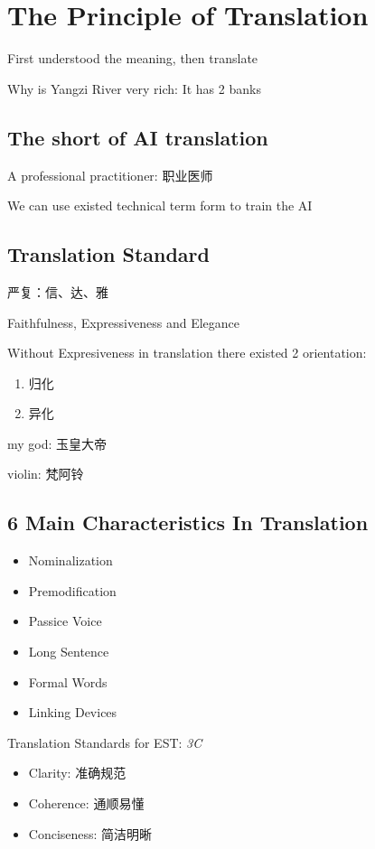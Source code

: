 \section{The Principle of Translation}%
\label{sec:The Principle of Translation}
First understood the meaning, then translate
\begin{eg}
    Why is Yangzi River very rich: It has 2 banks
\end{eg}
\subsection{The short of AI translation}%
\label{sub:The short of AI translation}
\begin{eg}
    A professional practitioner: 职业医师
\end{eg}
We can use existed technical term form to train the AI
\subsection{Translation Standard}%
\label{sub:Translation Standard}
\begin{notation}
    严复：信、达、雅

    Faithfulness, Expressiveness and Elegance
\end{notation}
Without Expresiveness in translation there existed 2 orientation: 
\begin{enumerate}
    \item 归化
    \item 异化
\end{enumerate}
\begin{eg}
    my god: 玉皇大帝
\end{eg}
\begin{eg}
    violin: 梵阿铃
\end{eg}
\subsection{6 Main Characteristics In Translation}%
\label{sub:6 Main Characteristics In Translation}
\begin{itemize}
    \item Nominalization
    \item Premodification
    \item Passice Voice
    \item Long Sentence
    \item Formal Words
    \item Linking Devices
\end{itemize}
\begin{notation}
    Translation Standards for EST: \textit{3C} 

    \begin{itemize}
        \item Clarity: 准确规范
        \item Coherence: 通顺易懂
        \item Conciseness: 简洁明晰
    \end{itemize}
\end{notation}
